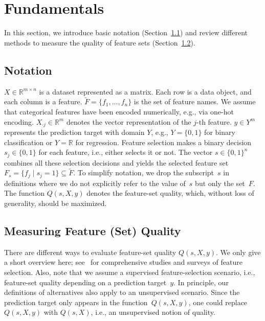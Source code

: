 \documentclass[iicol, sn-basic, Numbered]{sn-jnl} %
\theoremstyle{plain}
\theoremstyle{definition}
\begin{document}
\section{Fundamentals}
\label{sec:afs:fundamentals}

In this section, we introduce basic notation (Section~\ref{sec:afs:fundamentals:notation}) and review different methods to measure the quality of feature sets (Section~\ref{sec:afs:fundamentals:quality}).

\subsection{Notation}
\label{sec:afs:fundamentals:notation}

$X \in \mathbb{R}^{m \times n}$ is a dataset represented as a matrix.
Each row is a data object, and each column is a feature.
$\tilde{F} = \{f_1, \dots, f_n\}$ is the set of feature names.
We assume that categorical features have been encoded numerically, e.g., via one-hot encoding.
$X_{\cdot{}j} \in \mathbb{R}^m$ denotes the vector representation of the $j$-th feature.
$y \in Y^m$ represents the prediction target with domain $Y$, e.g., $Y=\{0,1\}$ for binary classification or $Y=\mathbb{R}$ for regression.
Feature selection makes a binary decision $s_j \in \{0,1\}$ for each feature, i.e., either selects it or not.
The vector $s \in \{0,1\}^n$ combines all these selection decisions and yields the selected feature set $F_s = \{f_j \mid s_j=1\} \subseteq \tilde{F}$.
To simplify notation, we drop the subscript~$s$ in definitions where we do not explicitly refer to the value of~$s$ but only the set~$F$.
The function $Q(s,X,y)$ denotes the feature-set quality, which, without loss of generality, should be maximized.

\subsection{Measuring Feature (Set) Quality}
\label{sec:afs:fundamentals:quality}

There are different ways to evaluate feature-set quality $Q(s,X,y)$.
We only give a short overview here; see~\cite{chandrashekar2014survey, li2017feature, njoku2023wrapper} for comprehensive studies and surveys of feature selection.
Also, note that we assume a supervised feature-selection scenario, i.e., feature-set quality depending on a prediction target~$y$.
In principle, our definitions of alternatives also apply to an unsupervised scenario.
Since the prediction target only appears in the function~$Q(s,X,y)$, one could replace~$Q(s,X,y)$ with $Q(s,X)$, i.e., an unsupervised notion of quality.
\end{document}
